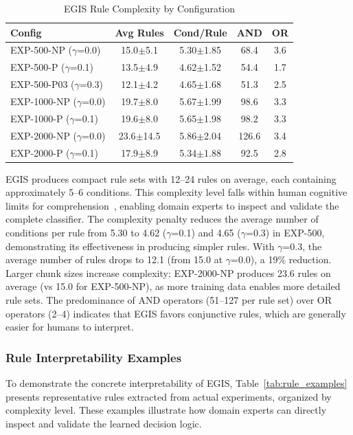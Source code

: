 \documentclass[lettersize,journal]{IEEEtran}
\begin{document}
\begin{table}[htbp]
\centering
\caption{EGIS Rule Complexity by Configuration}
\label{tab:complexity_detailed}
\scriptsize
\begin{tabular}{lcccc}
\toprule
\textbf{Config} & \textbf{Avg Rules} & \textbf{Cond/Rule} & \textbf{AND} & \textbf{OR} \\
\midrule
EXP-500-NP ($\gamma$=0.0) & 15.0$\pm$5.1 & 5.30$\pm$1.85 & 68.4 & 3.6 \\
EXP-500-P ($\gamma$=0.1) & 13.5$\pm$4.9 & 4.62$\pm$1.52 & 54.4 & 1.7 \\
EXP-500-P03 ($\gamma$=0.3) & 12.1$\pm$4.2 & 4.65$\pm$1.68 & 51.3 & 2.5 \\
EXP-1000-NP ($\gamma$=0.0) & 19.7$\pm$8.0 & 5.67$\pm$1.99 & 98.6 & 3.3 \\
EXP-1000-P ($\gamma$=0.1) & 19.6$\pm$8.0 & 5.65$\pm$1.98 & 98.2 & 3.3 \\
EXP-2000-NP ($\gamma$=0.0) & 23.6$\pm$14.5 & 5.86$\pm$2.04 & 126.6 & 3.4 \\
EXP-2000-P ($\gamma$=0.1) & 17.9$\pm$8.9 & 5.34$\pm$1.88 & 92.5 & 2.8 \\
\bottomrule
\end{tabular}
\end{table}

EGIS produces compact rule sets with 12--24 rules on average, each containing approximately 5--6 conditions. This complexity level falls within human cognitive limits for comprehension~\cite{miller1956magical}, enabling domain experts to inspect and validate the complete classifier. The complexity penalty reduces the average number of conditions per rule from 5.30 to 4.62 ($\gamma$=0.1) and 4.65 ($\gamma$=0.3) in EXP-500, demonstrating its effectiveness in producing simpler rules. With $\gamma$=0.3, the average number of rules drops to 12.1 (from 15.0 at $\gamma$=0.0), a 19\% reduction. Larger chunk sizes increase complexity: EXP-2000-NP produces 23.6 rules on average (vs 15.0 for EXP-500-NP), as more training data enables more detailed rule sets. The predominance of AND operators (51--127 per rule set) over OR operators (2--4) indicates that EGIS favors conjunctive rules, which are generally easier for humans to interpret.

\subsubsection{Rule Interpretability Examples}

To demonstrate the concrete interpretability of EGIS, Table~\ref{tab:rule_examples} presents representative rules extracted from actual experiments, organized by complexity level. These examples illustrate how domain experts can directly inspect and validate the learned decision logic.
\end{document}
